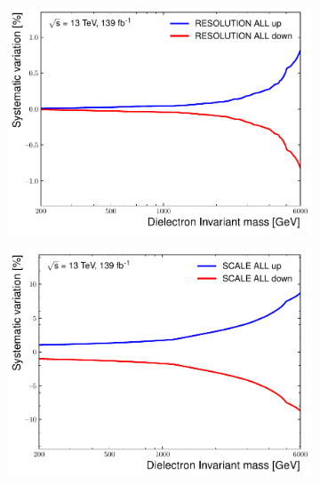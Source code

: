 \begin{figure}[]
    \centering
    \begin{subfigure}[b]{0.42\textwidth}
        \centering
        \includegraphics[width=\textwidth]{figures/analysis/datamc/Uncertainties/exp/ee/m_ee_pstOR_EG_RESOLUTION_ALL__1up.pdf}
        \label{fig:uncert:eeRes}
    \end{subfigure}
    \begin{subfigure}[b]{0.42\textwidth}
        \centering
        \includegraphics[width=\textwidth]{figures/analysis/datamc/Uncertainties/exp/ee/m_ee_pstOR_EG_SCALE_ALL__1up.pdf}
        \label{fig:uncert:eeScale}
    \end{subfigure}
    \begin{subfigure}[b]{0.42\textwidth}

\end{subfigure}
\end{figure}
